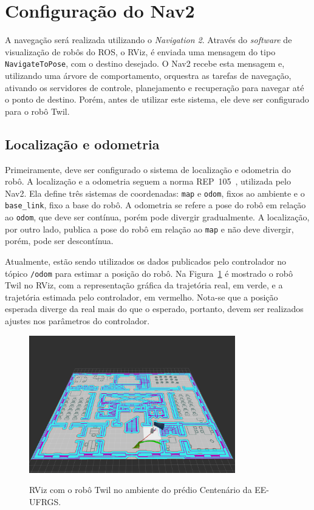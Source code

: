 \documentclass[repeatfields,xlists,xpacks,oneside,yearsonly]{ufrgscca}
\begin{document}
\section{Configuração do Nav2}

A navegação será realizada utilizando o \textit{Navigation 2}.
Através do \textit{software} de visualização de robôs do ROS, o RViz,
é enviada uma mensagem do tipo \texttt{NavigateToPose}, com o destino desejado.
O Nav2 recebe esta mensagem e, utilizando uma árvore de comportamento,
orquestra as tarefas de navegação, ativando os servidores de controle, planejamento
e recuperação para navegar até o ponto de destino.
Porém, antes de utilizar este sistema, ele deve ser configurado para o robô Twil.

\subsection{Localização e odometria}

Primeiramente, deve ser configurado o sistema de localização e odometria do robô.
A localização e a odometria seguem a norma REP~105~\cite{rep_105}, utilizada pelo Nav2.
Ela define três sistemas de coordenadas: \texttt{map} e \texttt{odom}, fixos ao
ambiente e o \texttt{base\_link}, fixo a base do robô.
A odometria se refere a pose do robô em relação ao \texttt{odom},
que deve ser contínua, porém pode divergir gradualmente.
A localização, por outro lado, publica a pose do robô em relação ao
\texttt{map} e não deve divergir, porém, pode ser descontínua.

Atualmente, estão sendo utilizados os dados publicados pelo controlador no
tópico \texttt{/odom} para estimar a posição do robô.
Na Figura~\ref{fig:robo_rviz} é mostrado o robô Twil no RViz, com a representação
gráfica da trajetória real, em verde, e a trajetória estimada pelo controlador,
em vermelho.
Nota-se que a posição esperada diverge da real mais do que o esperado, portanto,
devem ser realizados ajustes nos parâmetros do controlador.

\begin{figure}[htbp]
    {
        \centering
        \caption{RViz com o robô Twil no ambiente do prédio Centenário da EE-UFRGS.}
        \label{fig:robo_rviz}
        \includegraphics[width=0.8\textwidth]{erro_de_odometria.png}\\
    }
    {}
\end{figure}
\end{document}
